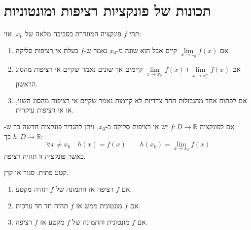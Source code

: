 \documentclass{tstextbook}
\begin{document}
\section{תכונות של פונקציות רציפות ומונטוניות}

\begin{definition}
תהי \(f\) פונקציה המוגדרת בסביבה מלאה של \(x_{0}\). אזי:

  \begin{enumerate}
    \item אם \(\underset{ x \to x_{0} }{\lim }f(x)\) קיים אבל הוא שונה מ-\(x_{0}\) נאמר ש-\(f\) בעלת אי רציפות סליקה 


    \item אם \(\underset{ x \to x_{0}^{+} }{\lim }f(x)\) ו-\(\underset{ x \to x_{0}^{-} }{\lim }f(x)\) קיימים אך שונים נאמר שקיים אי רציפות מהסוג הראשון. 


    \item אם לפתוח אחד מהגבולות החד צדדיות לא קיימות נאמר שקיים אי רציפות מהסוג השני, או אי רציפות עיקרית. 


  \end{enumerate}
\end{definition}
\begin{definition}
אם לפונקציה \(f:D\to \mathbb{R}\) יש אי רציפות סליקה ב-\(x_{0}\), ניתן להגדיר פונקציה חדשה כך ש-\(h:D\to \mathbb{R}\) כך:
$$\forall x \neq x_{0}\quad h(x)=f(x)\qquad h(x_{0})=\lim_{ x \to x_{0} } f(x)$$
כאשר פונקציה זו תהיה רציפה.

\end{definition}
\begin{definition}[מקטע]
קטע פתוח, סגור או קרן.

\end{definition}
\begin{proposition}
  \begin{enumerate}
    \item אם \(f\) רציפה אז התמונה של \(f\) תהיה מקטע. 


    \item אם \(f\) מונטונית ממש אז \(f\) תהיה חד חד ערכית. 


    \item אם \(f\) מונטונית והתמונה של \(f\) מקטע אז \(f\) רציפה. 


  \end{enumerate}
\end{proposition}
\end{document}
